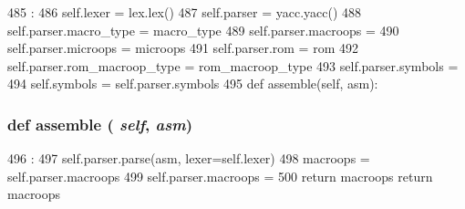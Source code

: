 \begin{DoxyCode}
485                                                 :
486         self.lexer = lex.lex()
487         self.parser = yacc.yacc()
488         self.parser.macro_type = macro_type
489         self.parser.macroops = {}
490         self.parser.microops = microops
491         self.parser.rom = rom
492         self.parser.rom_macroop_type = rom_macroop_type
493         self.parser.symbols = {}
494         self.symbols = self.parser.symbols
495 
    def assemble(self, asm):
\end{DoxyCode}
\hypertarget{classmicro__asm_1_1MicroAssembler_a141856bf71e916a2ab3ae8eec041443a}{
\subsubsection[{assemble}]{\setlength{\rightskip}{0pt plus 5cm}def assemble ( {\em self}, \/   {\em asm})}}
\label{classmicro__asm_1_1MicroAssembler_a141856bf71e916a2ab3ae8eec041443a}



\begin{DoxyCode}
496                            :
497         self.parser.parse(asm, lexer=self.lexer)
498         macroops = self.parser.macroops
499         self.parser.macroops = {}
500         return macroops
        return macroops
\end{DoxyCode}


